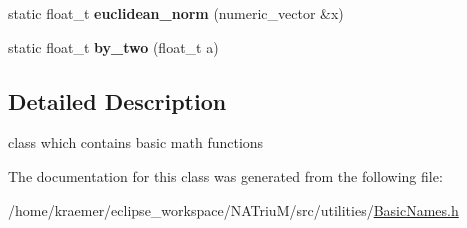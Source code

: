 \begin{DoxyCompactItemize}
\item 
\hypertarget{classnatrium_1_1Math_a20f4b206876293f69412c5c37299c412}{static float\-\_\-t {\bfseries euclidean\-\_\-norm} (numeric\-\_\-vector \&x)}\label{classnatrium_1_1Math_a20f4b206876293f69412c5c37299c412}

\item 
\hypertarget{classnatrium_1_1Math_a70941f44aae05e58f726edafc2883889}{static float\-\_\-t {\bfseries by\-\_\-two} (float\-\_\-t a)}\label{classnatrium_1_1Math_a70941f44aae05e58f726edafc2883889}

\end{DoxyCompactItemize}


\subsection{\-Detailed \-Description}
class which contains basic math functions 

\-The documentation for this class was generated from the following file\-:\begin{DoxyCompactItemize}
\item 
/home/kraemer/eclipse\-\_\-workspace/\-N\-A\-Triu\-M/src/utilities/\hyperlink{BasicNames_8h}{\-Basic\-Names.\-h}\end{DoxyCompactItemize}
